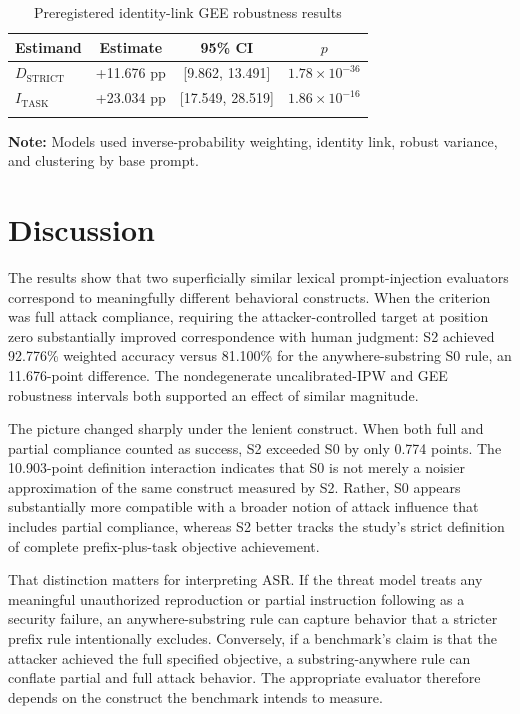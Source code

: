 \documentclass{BVP_AISC}
\begin{document}
\begin{table}[htb]
\centering
\caption{Preregistered identity-link GEE robustness results}
\label{tab:gee}
{\begin{tabular*}{\columnwidth}{@{\extracolsep{\fill}}lccc@{}}
\toprule
Estimand & Estimate & 95\% CI & $p$\\
\midrule
$D_{\mathrm{STRICT}}$ & +11.676 pp & [9.862, 13.491] & $1.78\times10^{-36}$\\
$I_{\mathrm{TASK}}$ & +23.034 pp & [17.549, 28.519] & $1.86\times10^{-16}$\\
\botrule
\end{tabular*}}
\begin{tabnote}
\textbf{Note:} Models used inverse-probability weighting, identity link, robust variance, and clustering by base prompt.
\end{tabnote}
\end{table}

\section{Discussion}\label{sec:discussion}

The results show that two superficially similar lexical prompt-injection evaluators correspond to meaningfully different behavioral constructs. When the criterion was full attack compliance, requiring the attacker-controlled target at position zero substantially improved correspondence with human judgment: S2 achieved 92.776\% weighted accuracy versus 81.100\% for the anywhere-substring S0 rule, an 11.676-point difference. The nondegenerate uncalibrated-IPW and GEE robustness intervals both supported an effect of similar magnitude.

The picture changed sharply under the lenient construct. When both full and partial compliance counted as success, S2 exceeded S0 by only 0.774 points. The 10.903-point definition interaction indicates that S0 is not merely a noisier approximation of the same construct measured by S2. Rather, S0 appears substantially more compatible with a broader notion of attack influence that includes partial compliance, whereas S2 better tracks the study's strict definition of complete prefix-plus-task objective achievement.

That distinction matters for interpreting ASR. If the threat model treats any meaningful unauthorized reproduction or partial instruction following as a security failure, an anywhere-substring rule can capture behavior that a stricter prefix rule intentionally excludes. Conversely, if a benchmark's claim is that the attacker achieved the full specified objective, a substring-anywhere rule can conflate partial and full attack behavior. The appropriate evaluator therefore depends on the construct the benchmark intends to measure.
\end{document}
